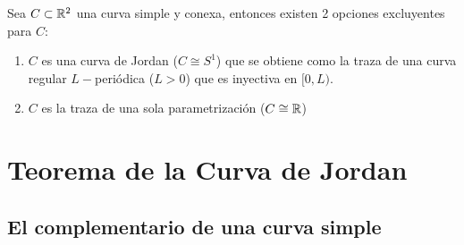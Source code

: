 \begin{teo}\label{teo:clasif}
    Sea $C\subset \mathbb{R}^2$ una curva simple y conexa, entonces existen 2 opciones excluyentes para $C$:
    \begin{enumerate}[label=\alph*)]
        \item $C$ es una curva de Jordan ($C \cong S^1$) que se obtiene como la traza de una curva regular $L-$periódica ($L>0$) que es inyectiva en $[0,L)$.
        \item $C$ es la traza de una sola parametrización ($C\cong \mathbb{R}$)
    \end{enumerate}
\end{teo}

\section{Teorema de la Curva de Jordan}

\subsection{El complementario de una curva simple}

